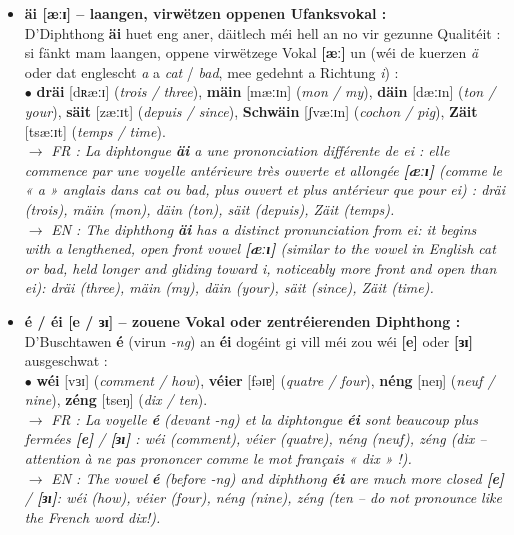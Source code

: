 \begin{itemize}
\begin{itemize}
        \item \textbf{äi {[æːɪ]} -- laangen, virwëtzen oppenen Ufanksvokal :} \\
        D'Diphthong \textbf{äi} huet eng aner, däitlech méi hell an no vir gezunne Qualitéit : si fänkt mam laangen, oppene virwëtzege Vokal \textbf{{[æː]}} un (wéi de kuerzen \textit{ä} oder dat englescht \textit{a} a \textit{cat} / \textit{bad}, mee gedehnt a Richtung \textit{i}) : \\
        $\bullet$ \textbf{dräi} {[dʀæːɪ]} (\textit{trois / three}), \textbf{mäin} {[mæːɪn]} (\textit{mon / my}), \textbf{däin} {[dæːɪn]} (\textit{ton / your}), \textbf{säit} {[zæːɪt]} (\textit{depuis / since}), \textbf{Schwäin} {[ʃvæːɪn]} (\textit{cochon / pig}), \textbf{Zäit} {[tsæːɪt]} (\textit{temps / time}). \\
        $\rightarrow$ \textit{FR : La diphtongue \textbf{äi} a une prononciation différente de \textit{ei} : elle commence par une voyelle antérieure très ouverte et allongée \textbf{[æːɪ]} (comme le « a » anglais dans \textit{cat} ou \textit{bad}, plus ouvert et plus antérieur que pour \textit{ei}) : \textit{dräi} (trois), \textit{mäin} (mon), \textit{däin} (ton), \textit{säit} (depuis), \textit{Zäit} (temps).} \\
        $\rightarrow$ \textit{EN : The diphthong \textbf{äi} has a distinct pronunciation from \textit{ei}: it begins with a lengthened, open front vowel \textbf{[æːɪ]} (similar to the vowel in English \textit{cat} or \textit{bad}, held longer and gliding toward \textit{i}, noticeably more front and open than \textit{ei}): \textit{dräi} (three), \textit{mäin} (my), \textit{däin} (your), \textit{säit} (since), \textit{Zäit} (time).}

        \vspace{0.3em}

        \item \textbf{é / éi {[e / ɜɪ]} -- zouene Vokal oder zentréierenden Diphthong :} \\
        D'Buschtawen \textbf{é} (virun \textit{-ng}) an \textbf{éi} dogéint gi vill méi zou wéi \textbf{{[e]}} oder \textbf{{[ɜɪ]}} ausgeschwat : \\
        $\bullet$ \textbf{wéi} {[vɜɪ]} (\textit{comment / how}), \textbf{véier} {[fəɪɐ]} (\textit{quatre / four}), \textbf{néng} {[neŋ]} (\textit{neuf / nine}), \textbf{zéng} {[tseŋ]} (\textit{dix / ten}). \\
        $\rightarrow$ \textit{FR : La voyelle \textbf{é} (devant \textit{-ng}) et la diphtongue \textbf{éi} sont beaucoup plus fermées \textbf{[e]} / \textbf{[ɜɪ]} : \textit{wéi} (comment), \textit{véier} (quatre), \textit{néng} (neuf), \textit{zéng} (dix -- attention à ne pas prononcer comme le mot français « dix » !).} \\
        $\rightarrow$ \textit{EN : The vowel \textbf{é} (before \textit{-ng}) and diphthong \textbf{éi} are much more closed \textbf{[e]} / \textbf{[ɜɪ]}: \textit{wéi} (how), \textit{véier} (four), \textit{néng} (nine), \textit{zéng} (ten -- do not pronounce like the French word \textit{dix}!).}
    \end{itemize}
\end{itemize}

